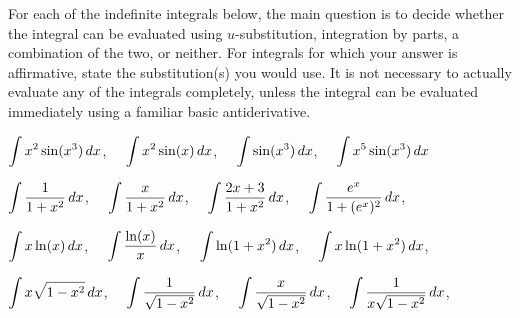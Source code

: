 \begin{pa} \label{PA:5.5}
For each of the indefinite integrals below, the main question is to decide whether the integral can be evaluated using $u$-substitution, integration by parts, a combination of the two, or neither.  For integrals for which your answer is affirmative, state the substitution(s) you would use.  It is not necessary to actually evaluate any of the integrals completely, unless the integral can be evaluated immediately using a familiar basic antiderivative.
\ba
	\item $\displaystyle \int x^2 \sin(x^3) \, dx$, \ \ $\displaystyle \int x^2 \sin(x) \, dx$, \ \  $\displaystyle \int \sin(x^3) \, dx$, \ \  $\displaystyle \int x^5 \sin(x^3) \, dx$ 
	\item $\displaystyle \int \frac{1}{1+x^2} \, dx$, \ \  $\displaystyle \int \frac{x}{1+x^2} \, dx$, \ \  $\displaystyle \int \frac{2x+3}{1+x^2} \, dx$, \ \ $\displaystyle \int \frac{e^x}{1+(e^x)^2} \, dx$, \ \ 
	\item $\displaystyle \int x \ln(x) \, dx$, \ \  $\displaystyle \int \frac{\ln(x)}{x} \, dx$, \ \  $\displaystyle \int \ln(1+x^2) \, dx$, \ \ $\displaystyle \int x\ln(1+x^2) \, dx$, \ \ 
	\item $\displaystyle \int x \sqrt{1-x^2} \, dx$, \ \  $\displaystyle \int \frac{1}{\sqrt{1-x^2}} \, dx$, \ \  $\displaystyle \int \frac{x}{\sqrt{1-x^2}}\, dx$, \ \ $\displaystyle \int \frac{1}{x\sqrt{1-x^2}} \, dx$, \ \ 
\ea
\end{pa} 
\afterpa